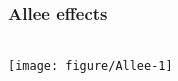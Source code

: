 \documentclass[color=usenames,dvipsnames]{beamer}\usepackage[]{graphicx}\usepackage[]{color}
\begin{document}
\begin{frame}[fragile]
  \frametitle{Allee effects}

  \begin{columns}
    \column{\dimexpr\paperwidth-10pt}
  \texttt{[image: figure/Allee-1]}
  \end{columns}
\end{frame}









\end{document}
